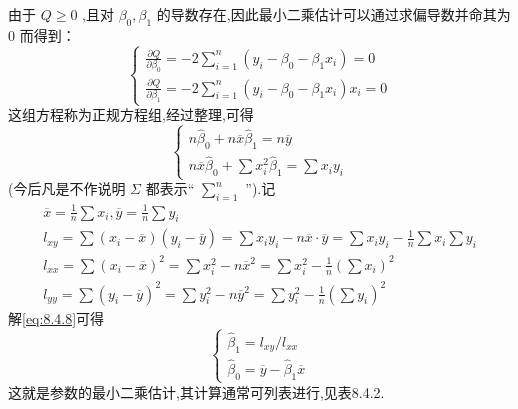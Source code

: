 由于 $ Q\ge 0  $ ,且对 $ \beta_0,\beta _1  $ 的导数存在,因此最小二乘估计可以通过求偏导数并命其为 $ 0  $ 而得到：
\begin{equation}
\left\{\begin{array}{l}
{\frac{\partial Q}{\partial \beta_{0}}=-2 \sum_{i=1}^{n}\left(y_{i}-\beta_{0}-\beta_{1} x_{i}\right)=0} \\ 
{\frac{\partial Q}{\partial \beta_{1}}=-2 \sum_{i=1}^{n}\left(y_{i}-\beta_{0}-\beta_{1} x_{i}\right) x_{i}=0}
\end{array}
\right.\label{eq:8.4.7}
\end{equation}
这组方程称为正规方程组,经过整理,可得
\begin{equation}
\left\{\begin{array}
{l}{n \hat{\beta}_{0}+n \overline{x} \hat{\beta}_{1}=n \overline{y}} \\ 
{n \overline{x} \hat{\beta}_{0}+\sum x_{i}^{2} \hat{\beta}_{1}=\sum x_{i} y_{i}}\end{array}
\right.\label{eq:8.4.8}
\end{equation}
(今后凡是不作说明 $ \Sigma  $ 都表示“ $ \sum\limits_{i=1}^{n}  $ ”).记
\begin{equation*}
\begin{array}{l}
{\overline{x}=\frac{1}{n} \sum x_{i}, \overline{y}=\frac{1}{n} \sum y_{i}}\\
{l_{x y}=\sum\left(x_{i}-\overline{x}\right)\left(y_{i}-\overline{y}\right)=\sum x_{i} y_{i}-n \overline{x} \cdot \overline{y}=\sum x_{i} y_{i}-\frac{1}{n} \sum x_{i} \sum y_{i}}\\
{l_{x x}=\sum\left(x_{i}-\overline{x}\right)^{2}=\sum x_{i}^{2}-n \overline{x}^{2}=\sum x_{i}^{2}-\frac{1}{n}\left(\sum x_{i}\right)^{2}} \\ 
{l_{y y}=\sum\left(y_{i}-\overline{y}\right)^{2}=\sum y_{i}^{2}-n \overline{y}^{2}=\sum y_{i}^{2}-\frac{1}{n}\left(\sum y_{i}\right)^{2}}
\end{array}
\end{equation*}
解\ref{eq:8.4.8}可得
\begin{equation}
\left\{\begin{array}{l}
{\hat{\beta}_{1}=l_{x y} / l_{x x}} \\ 
{\hat{\beta}_{0}=\overline{y}-\hat{\beta}_{1} \overline{x}}\end{array}
\right.\label{eq:8.4.9}
\end{equation}
这就是参数的最小二乘估计,其计算通常可列表进行,见表8.4.2.

